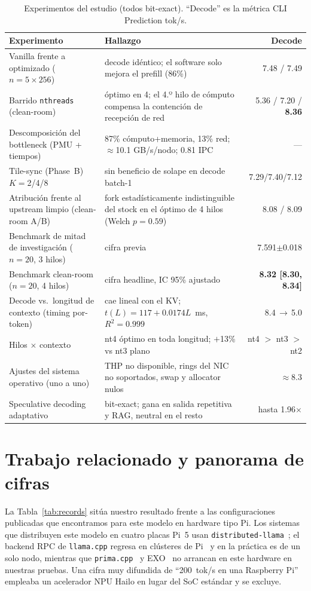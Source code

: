 \documentclass[10pt,a4paper]{article}
\begin{document}
\begin{table}[H]
\centering\small
\caption{Experimentos del estudio (todos bit-exact). ``Decode'' es la métrica CLI Prediction tok/s.}
\label{tab:trajectory}
\begin{tabularx}{\textwidth}{p{4.5cm}Xr}
\toprule
\textbf{Experimento} & \textbf{Hallazgo} & \textbf{Decode} \\
\midrule
Vanilla frente a optimizado ($n{=}5{\times}256$) & decode idéntico; el software solo mejora el prefill (86\%) & 7.48 / 7.49 \\
Barrido \texttt{nthreads} (clean-room) & óptimo en 4; el 4.º hilo de cómputo compensa la contención de recepción de red & 5.36 / 7.20 / \textbf{8.36} \\
Descomposición del bottleneck (PMU + tiempos) & 87\% cómputo+memoria, 13\% red; $\approx$10.1 GB/s/nodo; 0.81 IPC & --- \\
Tile-sync (Phase~B) $K{=}$2/4/8 & sin beneficio de solape en decode batch-1 & 7.29/7.40/7.12 \\
Atribución frente al upstream limpio (clean-room A/B) & fork estadísticamente indistinguible del stock en el óptimo de 4 hilos (Welch $p{=}0.59$) & 8.08 / 8.09 \\
Benchmark de mitad de investigación ($n{=}20$, 3 hilos) & cifra previa & 7.591$\pm$0.018 \\
Benchmark clean-room ($n{=}20$, 4 hilos) & cifra headline, IC 95\% ajustado & \textbf{8.32 [8.30, 8.34]} \\
Decode vs.\ longitud de contexto (timing por-token) & cae lineal con el KV; $t(L){=}117{+}0.0174L$~ms, $R^2{=}0.999$ & 8.4$\,\to\,$5.0 \\
Hilos $\times$ contexto & nt4 óptimo en toda longitud; $+$13\% vs nt3 plano & nt4 $>$ nt3 $>$ nt2 \\
Ajustes del sistema operativo (uno a uno) & THP no disponible, rings del NIC no soportados, swap y allocator nulos & $\approx$8.3 \\
Speculative decoding adaptativo & bit-exact; gana en salida repetitiva y RAG, neutral en el resto & hasta 1.96$\times$ \\
\bottomrule
\end{tabularx}
\end{table}

\section{Trabajo relacionado y panorama de cifras}
\label{sec:related}
La Tabla~\ref{tab:records} sitúa nuestro resultado frente a las configuraciones publicadas que encontramos para este modelo en hardware tipo Pi. Los sistemas que distribuyen este modelo en cuatro placas Pi~5 usan \texttt{distributed-llama}~\citep{tadych2024}; el backend RPC de \texttt{llama.cpp} regresa en clústeres de Pi~\citep{geerling2025} y en la práctica es de un solo nodo, mientras que \texttt{prima.cpp}~\citep{li2025prima} y EXO~\citep{exo2025} no arrancan en este hardware en nuestras pruebas. Una cifra muy difundida de ``200~tok/s en una Raspberry Pi'' empleaba un acelerador NPU Hailo en lugar del SoC estándar y se excluye.
\end{document}
